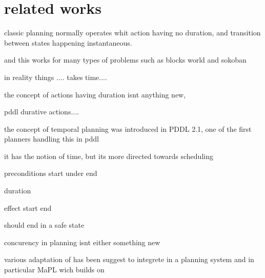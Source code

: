 \section{related works}

classic planning normally operates whit action having no duration, and transition between states happening instantaneous.

and this works for many types of problems such as blocks world and sokoban


in reality things .... takes time.... 

the concept of actions having duration isnt anything new,


pddl durative actions....

the concept of temporal planning was introduced in PDDL 2.1, one of the first planners handling this in pddl \cite{durative}

it has the notion of time, but its more directed towards scheduling

preconditions
	start
	under
	end
	
duration

effect
	start
	end
	
	
should end in a safe state




concurency in planning isnt either something new

various adaptation of has been suggest to integrete in a planning system
and in particular MaPL wich builds on
\cite{mapl}